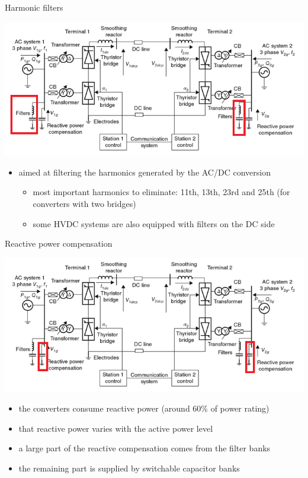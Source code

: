 \begin{frame}{Harmonic filters}
\begin{center}
    \includegraphics[width=0.5\linewidth]{images/typical-HVDC4.png}
\end{center}
\begin{itemize}
    \item aimed at filtering the harmonics generated by the AC/DC conversion
    \begin{itemize}
        \item most important harmonics to eliminate: 11th, 13th, 23rd and 25th (for converters with two bridges)
        \item some HVDC systems are also equipped with filters on the DC side
    \end{itemize}
\end{itemize}
\end{frame}

\begin{frame}{Reactive power compensation}
\begin{center}
    \includegraphics[width=0.5\linewidth]{images/typical-HVDC5.png}
\end{center}
\begin{itemize}
    \item the converters consume reactive power (around 60\% of power rating)
    \item that reactive power varies with the active power level
    \item a large part of the reactive compensation comes from the filter banks
    \item the remaining part is supplied by switchable capacitor banks
\end{itemize}
\end{frame}

